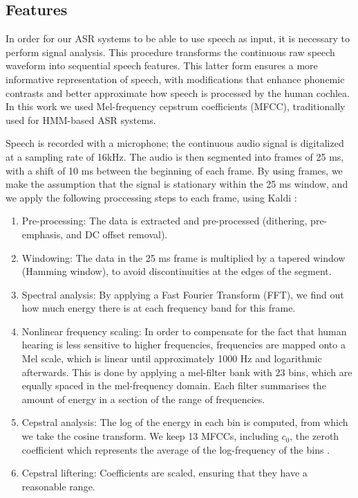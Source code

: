 \subsection{Features}
In order for our ASR systems to be able to use speech as input, it is necessary to perform signal analysis. This procedure transforms the continuous raw speech waveform into sequential speech features. This latter form ensures a more informative representation of speech, with modifications that enhance phonemic contrasts and better approximate how speech is processed by the human cochlea. In this work we used Mel-frequency cepstrum coefficients (MFCC), traditionally used for HMM-based ASR systems.

Speech is recorded with a microphone; the continuous audio signal is digitalized at a sampling rate of 16kHz.
The audio is then segmented into frames of 25 ms, with a shift of 10 ms between the beginning of each frame. By using frames, we make the assumption that the signal is stationary within the 25 ms window, and we apply the following proccessing steps to each frame, using Kaldi \cite{povey2011}:

\begin{enumerate}
\item Pre-processing: The data is extracted and pre-processed (dithering, pre-emphasis, and DC offset removal).
\item Windowing: The data in the 25 ms frame is multiplied by a tapered window (Hamming window), to avoid discontinuities at the edges of the segment.
\item Spectral analysis: By applying a Fast Fourier Transform (FFT), we find out how much energy there is at each frequency band for this frame.
\item Nonlinear frequency scaling: In order to compensate for the fact that human hearing is less sensitive to higher frequencies, frequencies are mapped onto a Mel scale, which is linear until approximately 1000 Hz and logarithmic afterwards. This is done by applying a mel-filter bank with 23 bins, which are equally spaced in the mel-frequency domain. Each filter summarises the amount of energy in a section of the range of frequencies. 
\item Cepstral analysis: The log of the energy in each bin is computed, from which we take the cosine transform. We keep 13 MFCCs, including $c_{0}$, the zeroth coefficient which represents the average of the log-frequency of the bins \cite{gales2008}.
  \item Cepstral liftering: Coefficients are scaled, ensuring that they have a reasonable range.
\end{enumerate}

